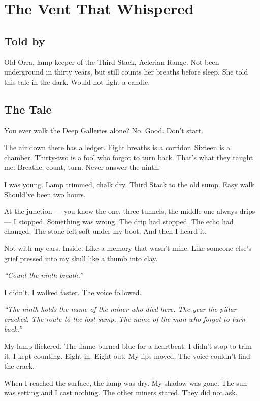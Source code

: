\chapter{The Vent That Whispered}

\section*{Told by}

Old Orra, lamp-keeper of the Third Stack, Aelerian Range. Not been underground in thirty years, but still counts her breaths before sleep. She told this tale in the dark. Would not light a candle.

\section*{The Tale}

You ever walk the Deep Galleries alone? No. Good. Don't start.

The air down there has a ledger. Eight breaths is a corridor. Sixteen is a chamber. Thirty-two is a fool who forgot to turn back. That's what they taught me. Breathe, count, turn. Never answer the ninth.

I was young. Lamp trimmed, chalk dry. Third Stack to the old sump. Easy walk. Should've been two hours.

At the junction --- you know the one, three tunnels, the middle one always drips --- I stopped. Something was wrong. The drip had stopped. The echo had changed. The stone felt soft under my boot. And then I heard it.

Not with my ears. Inside. Like a memory that wasn't mine. Like someone else's grief pressed into my skull like a thumb into clay.

\emph{``Count the ninth breath.''}

I didn't. I walked faster. The voice followed.

\emph{``The ninth holds the name of the miner who died here. The year the pillar cracked. The route to the lost sump. The name of the man who forgot to turn back.''}

My lamp flickered. The flame burned blue for a heartbeat. I didn't stop to trim it. I kept counting. Eight in. Eight out. My lips moved. The voice couldn't find the crack.

When I reached the surface, the lamp was dry. My shadow was gone. The sun was setting and I cast nothing. The other miners stared. They did not ask.

